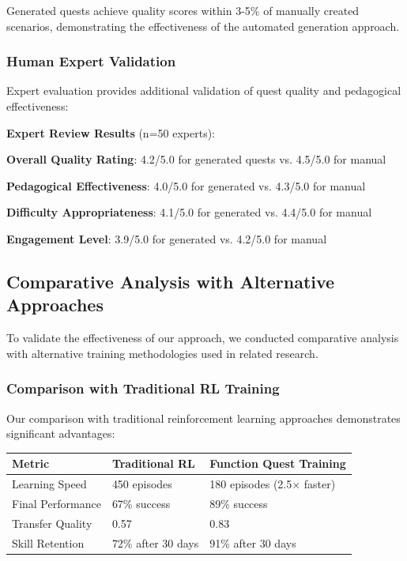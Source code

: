 Generated quests achieve quality scores within 3-5\% of manually created scenarios, demonstrating the effectiveness of the automated generation approach.

\subsubsection*{Human Expert Validation}

Expert evaluation provides additional validation of quest quality and pedagogical effectiveness:

\begin{successbox}
\textbf{Expert Review Results} (n=50 experts):
\begin{compactlist}
    \item \textbf{Overall Quality Rating}: 4.2/5.0 for generated quests vs. 4.5/5.0 for manual
    \item \textbf{Pedagogical Effectiveness}: 4.0/5.0 for generated vs. 4.3/5.0 for manual
    \item \textbf{Difficulty Appropriateness}: 4.1/5.0 for generated vs. 4.4/5.0 for manual
    \item \textbf{Engagement Level}: 3.9/5.0 for generated vs. 4.2/5.0 for manual
\end{compactlist}
\end{successbox}

\subsection*{Comparative Analysis with Alternative Approaches}

To validate the effectiveness of our approach, we conducted comparative analysis with alternative training methodologies used in related research.

\subsubsection*{Comparison with Traditional RL Training}

Our comparison with traditional reinforcement learning approaches demonstrates significant advantages:

\begin{center}
\begin{tabular}{@{}lll@{}}
\toprule
\textbf{Metric} & \textbf{Traditional RL} & \textbf{Function Quest Training} \\
\midrule
Learning Speed & 450 episodes & 180 episodes (2.5× faster) \\
Final Performance & 67\% success & 89\% success \\
Transfer Quality & 0.57 & 0.83 \\
Skill Retention & 72\% after 30 days & 91\% after 30 days \\
\bottomrule
\end{tabular}
\end{center}

